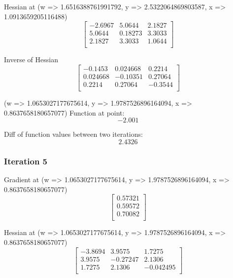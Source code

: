 \documentclass{article}
\begin{document}
Hessian at (w => 1.6516388761991792, y => 2.5322064869803587, x => 1.0913659205116488)
\begin{equation}
\left[
\begin{array}{ccc}
-2.6967 & 5.0644 & 2.1827 \\
5.0644 & 0.18273 & 3.3033 \\
2.1827 & 3.3033 & 1.0644 \\
\end{array}
\right]
\end{equation}

Inverse of Hessian
\begin{equation}
\left[
\begin{array}{ccc}
-0.1453 & 0.024668 & 0.2214 \\
0.024668 & -0.10351 & 0.27064 \\
0.2214 & 0.27064 & -0.3544 \\
\end{array}
\right]
\end{equation}

(w => 1.0653027177675614, y => 1.9787526896164094, x => 0.8637658180657077)
Function at point:
\begin{equation}
-2.001
\end{equation}

Diff of function values between two iterations:
\begin{equation}
2.4326
\end{equation}

\subsubsection{Iteration 5}
Gradient at (w => 1.0653027177675614, y => 1.9787526896164094, x => 0.8637658180657077)
\begin{equation}
\left[
\begin{array}{c}
0.57321 \\
0.59572 \\
0.70082 \\
\end{array}
\right]
\end{equation}

Hessian at (w => 1.0653027177675614, y => 1.9787526896164094, x => 0.8637658180657077)
\begin{equation}
\left[
\begin{array}{ccc}
-3.8694 & 3.9575 & 1.7275 \\
3.9575 & -0.27247 & 2.1306 \\
1.7275 & 2.1306 & -0.042495 \\
\end{array}
\right]
\end{equation}
\end{document}
